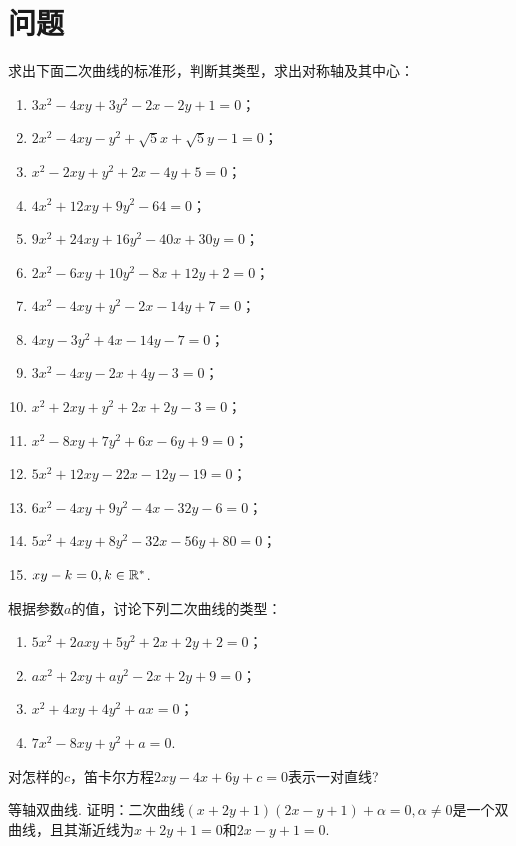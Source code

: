 \section{问题}
\begin{problem}
  求出下面二次曲线的标准形，判断其类型，求出对称轴及其中心：
  \begin{enumerate}[left=0cm,align=right,label=(\arabic*)]
    \item $3x^2-4xy+3y^2-2x-2y+1=0$；
    \item $2x^2-4xy-y^2+\sqrt5x+\sqrt5y-1=0$；
    \item $x^2-2xy+y^2+2x-4y+5=0$；
    \item $4x^2+12xy+9y^2-64=0$；
    \item $9x^2+24xy+16y^2-40x+30y=0$；
    \item $2x^2-6xy+10y^2-8x+12y+2=0$；
    \item $4x^2-4xy+y^2-2x-14y+7=0$；
    \item $4xy-3y^2+4x-14y-7=0$；
    \item $3x^2-4xy-2x+4y-3=0$；
    \item $x^2+2xy+y^2+2x+2y-3=0$；
    \item $x^2-8xy+7y^2+6x-6y+9=0$；
    \item $5x^2+12xy-22x-12y-19=0$；
    \item $6x^2-4xy+9y^2-4x-32y-6=0$；
    \item $5x^2+4xy+8y^2-32x-56y+80=0$；
    \item $xy-k=0,k\in\mathbb R^\ast$.
  \end{enumerate}
\end{problem}

\begin{problem}
  根据参数$a$的值，讨论下列二次曲线的类型：
  \begin{enumerate}[left=0cm,align=right,label=(\arabic*)]
    \item $5x^2+2axy+5y^2+2x+2y+2=0$；
    \item $ax^2+2xy+ay^2-2x+2y+9=0$；
    \item $x^2+4xy+4y^2+ax=0$；
    \item $7x^2-8xy+y^2+a=0$.
  \end{enumerate}
\end{problem}

\begin{problem}
  对怎样的$c$，笛卡尔方程$2xy-4x+6y+c=0$表示一对直线?
\end{problem}

\begin{problem}
  {\kaishu 等轴双曲线.} 证明：二次曲线$(x+2y+1)(2x-y+1)+\alpha=0,\alpha\ne0$是一个双曲线，且其渐近线为$x+2y+1=0$和$2x-y+1=0$.
\end{problem}

